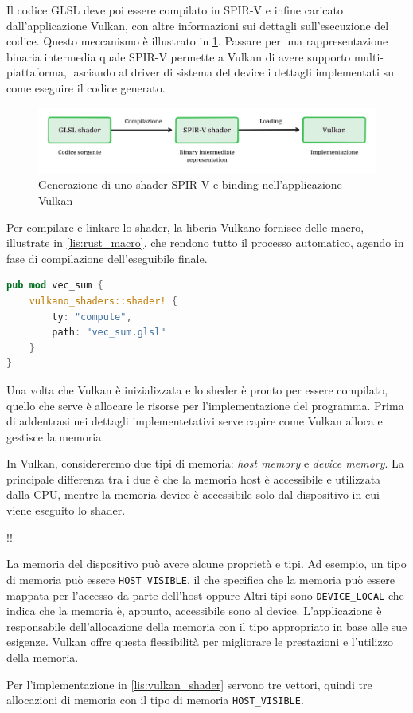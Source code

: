 Il codice GLSL deve poi essere compilato in SPIR-V e infine caricato dall'applicazione Vulkan, con altre informazioni sui dettagli sull'esecuzione del codice. Questo meccanismo è illustrato in \ref{fig:shader}. Passare per una rappresentazione binaria intermedia quale SPIR-V permette a Vulkan di avere supporto multi-piattaforma, lasciando al driver di sistema del device i dettagli implementati su come eseguire il codice generato.

\begin{figure}[ht]
    \centering
    \includegraphics[width=.9\linewidth]{images/chapter2/shader.png}
    \caption{Generazione di uno shader SPIR-V e binding nell'applicazione Vulkan}
    \label{fig:shader}
\end{figure}


Per compilare e linkare lo shader, la liberia Vulkano fornisce delle macro, illustrate in \ref{lis:rust_macro}, che rendono tutto il processo automatico, agendo in fase di compilazione dell'eseguibile finale.

\begin{lstlisting}[language=Rust, caption=Compilazione e binding dello shader GLSL, label=lis:rust_macro]
pub mod vec_sum {
    vulkano_shaders::shader! {
        ty: "compute",
        path: "vec_sum.glsl"
    }
}    
\end{lstlisting}

Una volta che Vulkan è inizializzata e lo sheder è pronto per essere compilato, quello che serve è allocare le risorse per l'implementazione del programma. Prima di addentrasi nei dettagli implementetativi serve capire come Vulkan alloca e gestisce la memoria.

In Vulkan, considereremo due tipi di memoria: \textit{host memory} e \textit{device memory}. La principale differenza tra i due è che la memoria host è accessibile e utilizzata dalla CPU, mentre la memoria device è accessibile solo dal dispositivo in cui viene eseguito lo shader. 

!! 

La memoria del dispositivo può avere alcune proprietà e tipi. Ad esempio, un tipo di memoria può essere \verb|HOST_VISIBLE|, il che specifica che la memoria può essere mappata per l'accesso da parte dell'host oppure Altri tipi sono \verb|DEVICE_LOCAL| che indica che la memoria è, appunto, accessibile sono al device. L'applicazione è responsabile dell'allocazione della memoria con il tipo appropriato in base alle sue esigenze. Vulkan offre questa flessibilità per migliorare le prestazioni e l'utilizzo della memoria.

Per l'implementazione in \ref{lis:vulkan_shader} servono tre vettori, quindi tre allocazioni di memoria con il tipo di memoria \verb|HOST_VISIBLE|. 

 



    

